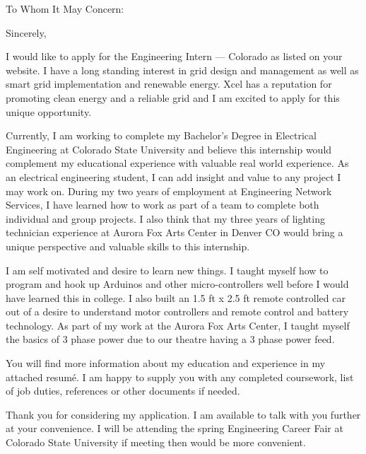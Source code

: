 \documentclass[10pt,letterpaper,sans]{moderncv}        %
\begin{document}



\clearpage
{}
\date{\today}
\opening{To Whom It May Concern:}
\closing{Sincerely,}
\makelettertitle{}

I would like to apply for the Engineering Intern --- Colorado as listed on your website. I have a long standing interest in grid design and management as well as smart grid implementation and renewable energy. Xcel has a reputation for promoting clean energy and a reliable grid and I am excited to apply for this unique opportunity.

Currently, I am working to complete my Bachelor's Degree in Electrical Engineering at Colorado State University and believe this internship would complement my educational experience with valuable real world experience. As an electrical engineering student, I can add insight and value to any project I may work on. During my two years of employment at Engineering Network Services, I have learned how to work as part of a team to complete both individual and group projects. I also think that my three years of lighting technician experience at Aurora Fox Arts Center in Denver CO would bring a unique perspective and valuable skills to this internship.

I am self motivated and desire to learn new things. I taught myself how to program and hook up Arduinos and other micro-controllers well before I would have learned this in college. I also built an 1.5 ft x 2.5 ft remote controlled car out of a desire to understand motor controllers and remote control and battery technology. As part of my work at the Aurora Fox Arts Center, I taught myself the basics of 3 phase power due to our theatre having a 3 phase power feed.

You will find more information about my education and experience in my attached resum\'e. I am happy to supply you with any completed coursework, list of job duties, references or other documents if needed.

Thank you for considering my application. I am available to talk with you further at your convenience. I will be attending the spring Engineering Career Fair at Colorado State University if meeting then would be more convenient.



\makeletterclosing{}
\end{document}

